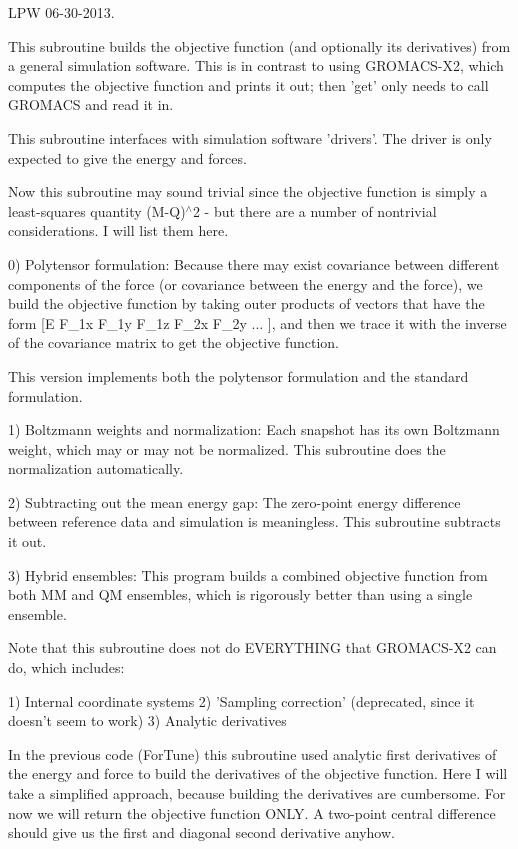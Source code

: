 \-L\-P\-W 06-\/30-\/2013. 

\-This subroutine builds the objective function (and optionally its derivatives) from a general simulation software. \-This is in contrast to using \-G\-R\-O\-M\-A\-C\-S-\/\-X2, which computes the objective function and prints it out; then 'get' only needs to call \-G\-R\-O\-M\-A\-C\-S and read it in.

\-This subroutine interfaces with simulation software 'drivers'. \-The driver is only expected to give the energy and forces.

\-Now this subroutine may sound trivial since the objective function is simply a least-\/squares quantity (\-M-\/\-Q)$^\wedge$2 -\/ but there are a number of nontrivial considerations. \-I will list them here.

0) \-Polytensor formulation\-: \-Because there may exist covariance between different components of the force (or covariance between the energy and the force), we build the objective function by taking outer products of vectors that have the form \mbox{[}\-E \-F\-\_\-1x \-F\-\_\-1y \-F\-\_\-1z \-F\-\_\-2x \-F\-\_\-2y ... \mbox{]}, and then we trace it with the inverse of the covariance matrix to get the objective function.

\-This version implements both the polytensor formulation and the standard formulation.

1) \-Boltzmann weights and normalization\-: \-Each snapshot has its own \-Boltzmann weight, which may or may not be normalized. \-This subroutine does the normalization automatically.

2) \-Subtracting out the mean energy gap\-: \-The zero-\/point energy difference between reference data and simulation is meaningless. \-This subroutine subtracts it out.

3) \-Hybrid ensembles\-: \-This program builds a combined objective function from both \-M\-M and \-Q\-M ensembles, which is rigorously better than using a single ensemble.

\-Note that this subroutine does not do \-E\-V\-E\-R\-Y\-T\-H\-I\-N\-G that \-G\-R\-O\-M\-A\-C\-S-\/\-X2 can do, which includes\-:

1) \-Internal coordinate systems 2) '\-Sampling correction' (deprecated, since it doesn't seem to work) 3) \-Analytic derivatives

\-In the previous code (\-For\-Tune) this subroutine used analytic first derivatives of the energy and force to build the derivatives of the objective function. \-Here \-I will take a simplified approach, because building the derivatives are cumbersome. \-For now we will return the objective function \-O\-N\-L\-Y. \-A two-\/point central difference should give us the first and diagonal second derivative anyhow.

